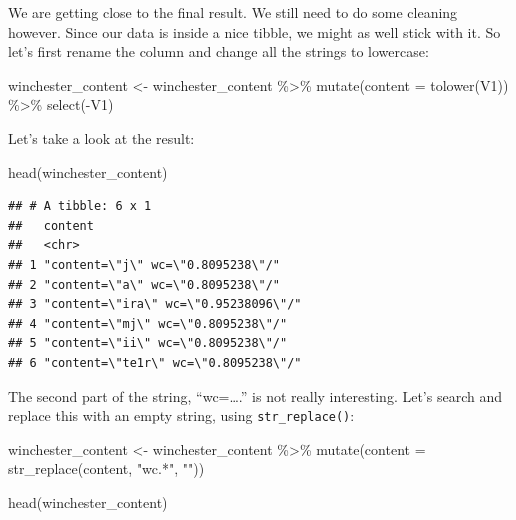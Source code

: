 \documentclass[
]{article}
\newenvironment{Shaded}{\begin{snugshade}}{\end{snugshade}}
\newcommand{\AttributeTok}[1]{\textcolor[rgb]{0.77,0.63,0.00}{#1}}
\newcommand{\FunctionTok}[1]{\textcolor[rgb]{0.00,0.00,0.00}{#1}}
\newcommand{\NormalTok}[1]{#1}
\newcommand{\OtherTok}[1]{\textcolor[rgb]{0.56,0.35,0.01}{#1}}
\newcommand{\SpecialCharTok}[1]{\textcolor[rgb]{0.00,0.00,0.00}{#1}}
\newcommand{\StringTok}[1]{\textcolor[rgb]{0.31,0.60,0.02}{#1}}
\begin{document}
We are getting close to the final result. We still need to do some cleaning however. Since our data
is inside a nice tibble, we might as well stick with it. So let's first rename the column and
change all the strings to lowercase:

\begin{Shaded}
\begin{Highlighting}[]
\NormalTok{winchester\_content }\OtherTok{\textless{}{-}}\NormalTok{ winchester\_content }\SpecialCharTok{\%\textgreater{}\%} 
  \FunctionTok{mutate}\NormalTok{(}\AttributeTok{content =} \FunctionTok{tolower}\NormalTok{(V1)) }\SpecialCharTok{\%\textgreater{}\%} 
  \FunctionTok{select}\NormalTok{(}\SpecialCharTok{{-}}\NormalTok{V1)}
\end{Highlighting}
\end{Shaded}

Let's take a look at the result:

\begin{Shaded}
\begin{Highlighting}[]
\FunctionTok{head}\NormalTok{(winchester\_content)}
\end{Highlighting}
\end{Shaded}

\begin{verbatim}
## # A tibble: 6 x 1
##   content                             
##   <chr>                               
## 1 "content=\"j\" wc=\"0.8095238\"/"   
## 2 "content=\"a\" wc=\"0.8095238\"/"   
## 3 "content=\"ira\" wc=\"0.95238096\"/"
## 4 "content=\"mj\" wc=\"0.8095238\"/"  
## 5 "content=\"ii\" wc=\"0.8095238\"/"  
## 6 "content=\"te1r\" wc=\"0.8095238\"/"
\end{verbatim}

The second part of the string, ``wc=\ldots.'' is not really interesting. Let's search and replace this
with an empty string, using \texttt{str\_replace()}:

\begin{Shaded}
\begin{Highlighting}[]
\NormalTok{winchester\_content }\OtherTok{\textless{}{-}}\NormalTok{ winchester\_content }\SpecialCharTok{\%\textgreater{}\%} 
  \FunctionTok{mutate}\NormalTok{(}\AttributeTok{content =} \FunctionTok{str\_replace}\NormalTok{(content, }\StringTok{"wc.*"}\NormalTok{, }\StringTok{""}\NormalTok{))}

\FunctionTok{head}\NormalTok{(winchester\_content)}
\end{Highlighting}
\end{Shaded}
\end{document}
